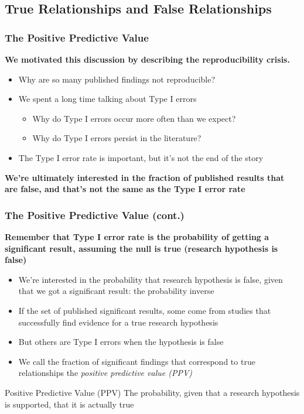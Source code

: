 \documentclass[10pt, block=fill]{beamer}
\begin{document}
\subsection{True Relationships and False Relationships}

\begin{frame}
    \frametitle{The Positive Predictive Value}
    
    \textbf{We motivated this discussion by describing the reproducibility crisis.} 
    
    \begin{itemize}
        \item Why are so many published findings not reproducible?
        \item We spent a long time talking about Type I errors
        \begin{itemize}
            \item Why do Type I errors occur more often than we expect?
            \item Why do Type I errors persist in the literature?
        \end{itemize}
        \item The Type I error rate is important, but it's not the end of the story
    \end{itemize}
    
    \textbf{We're ultimately interested in the fraction of published results that are false, and that's not the same as the Type I error rate}
\end{frame}

\begin{frame}
    \frametitle{The Positive Predictive Value (cont.)}
    
    \textbf{Remember that Type I error rate is the probability of getting a significant result, assuming the null is true (research hypothesis is false)}
    \begin{itemize}
        \item We're interested in the probability that research hypothesis is false, given that we got a significant result: the probability inverse
        \item If the set of published significant results, some come from studies that successfully find evidence for a true research hypothesis
        \item But others are Type I errors when the hypothesis is false
        \item We call the fraction of significant findings that correspond to true relationships the \textit{positive predictive value (PPV)}
    \end{itemize}
    
    \begin{block}{Positive Predictive Value (PPV)}
        The probability, given that a research hypothesis is supported, that it is actually true
    \end{block}
\end{frame}
\end{document}
